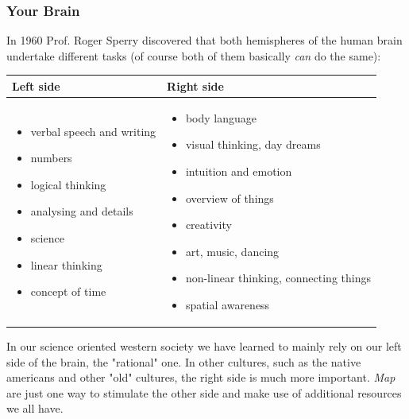 \documentclass[12pt,a4paper]{article}
\begin{document}
\subsubsection*{Your Brain}
In 1960 Prof. {\sc Roger Sperry} discovered that both hemispheres
of the human brain undertake different tasks (of course both of them
basically {\em can} do the same): 
\begin{center}
\begin{tabular}{|p{5.5cm}|p{5.5cm}|} \hline
    Left side & Right side \\ \hline
    \begin{itemize}
       \item verbal speech and writing 
       \item numbers
       \item logical thinking
       \item analysing and details
       \item science
       \item linear thinking
       \item concept of time
    \end{itemize} &
    \begin{itemize}
        \item body language
        \item visual thinking, day dreams
        \item intuition and emotion
        \item overview of things
        \item creativity
        \item art, music, dancing
        \item non-linear thinking, connecting things
        \item spatial awareness
    \end{itemize}     \\ \hline
\end{tabular}   
\end{center}
In our science oriented western society we have learned to mainly rely
on our left side of the brain, the "rational" one. In other cultures,
such as the native americans and other "old" cultures, the right side is
much more important. {\em Map} are just one way to stimulate the other
side and make use of additional resources we all have.
\end{document}
